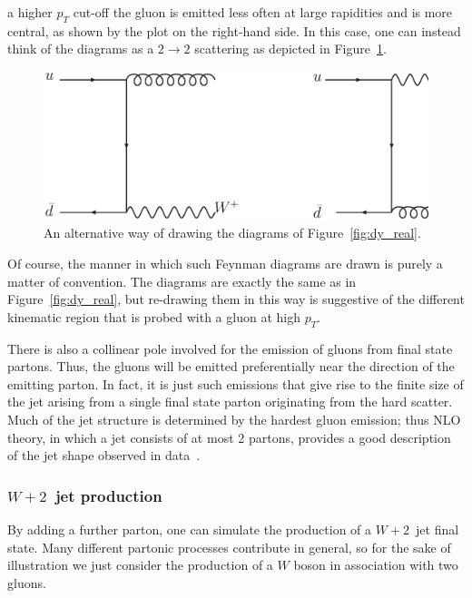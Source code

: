 \documentclass[12pt]{iopart}
\begin{document}
a higher $p_T$ cut-off the gluon is emitted less often at large rapidities and is more central, as
shown by the plot on the right-hand side. In this case, one can instead think of the diagrams as a
$2 \to 2$ scattering as depicted in Figure~\ref{fig:dy_real2to2}.
%
\begin{figure}[t]
\begin{center}
\includegraphics[width=12cm]{dy_real2to2.ps}
\end{center}
\caption{An alternative way of drawing the diagrams of Figure~\ref{fig:dy_real}.}
\label{fig:dy_real2to2}
\end{figure}
%
Of course, the manner in which such Feynman diagrams are drawn is purely a matter of convention. 
The diagrams are exactly the same as in Figure~\ref{fig:dy_real}, but re-drawing them in this way
is suggestive of the different kinematic region that is probed with a gluon at high $p_T$.

There is also a collinear pole involved for the emission of gluons from final state partons. Thus, the gluons will
be emitted preferentially near the direction of the emitting parton. In fact, it is just such emissions that give
rise to the finite size of the jet arising from a single final state parton originating from the hard scatter. Much
of the jet structure is determined by the hardest gluon emission; thus NLO theory, in which a jet consists of at
most 2 partons, provides a good description of the jet shape observed in data~\cite{Ellis:1992qq}. 

\subsubsection{$W+2$~jet production}
\label{sec:w2j}

By adding a further parton, one can simulate the production of a $W+2$~jet final state. Many
different partonic processes contribute in general, so for the sake of illustration
we just consider the production of a $W$ boson in association with two gluons.
\end{document}
